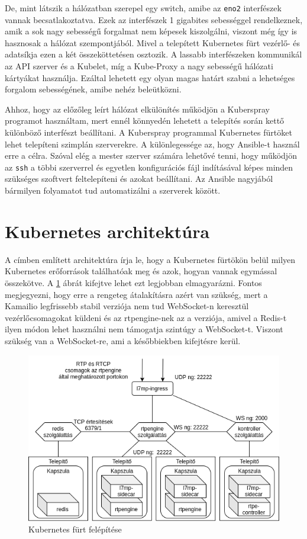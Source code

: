 De, mint látszik a hálózatban szerepel egy switch, amibe az \texttt{eno2} interfészek 
vannak becsatlakoztatva. Ezek az interfészek 1 gigabites sebességgel rendelkeznek, amik
a sok nagy sebességű forgalmat nem képesek kiszolgálni, viszont még így is hasznosak
a hálózat szempontjából. Mivel a telepített Kubernetes fürt vezérlő- és adatsíkja
ezen a két összeköttetésen osztozik. A lassabb interfészeken kommunikál az
API szerver és a Kubelet, míg a Kube-Proxy a nagy sebességű hálózati kártyákat 
használja. Ezáltal lehetett egy olyan magas határt szabni a lehetséges forgalom
sebességének, amibe nehéz beleütközni. 

Ahhoz, hogy az előzőleg leírt hálózat elkülönítés működjön a Kuberspray programot 
használtam, mert ennél könnyedén lehetett a telepítés során kettő különböző interfészt
beállítani. A Kuberspray \cite{kubespray} programmal Kubernetes fürtöket lehet 
telepíteni szimplán szerverekre. A különlegessége az, hogy Ansible-t használ erre a 
célra. Szóval elég a mester szerver számára lehetővé tenni, hogy működjön az \texttt{ssh} 
a többi szerverrel és egyetlen konfigurációs fájl indításával képes minden szükséges 
szoftvert feltelepíteni és azokat beállítani. Az Ansible \cite{ansible} nagyjából 
bármilyen folyamatot tud automatizálni a szerverek között. 

\section{Kubernetes architektúra}

A címben említett architektúra írja le, hogy a Kubernetes fürtökön belül milyen 
Kubernetes erőforrások találhatóak meg és azok, hogyan vannak egymással összekötve. A 
\ref{fig:clusterSetup} ábrát kifejtve lehet ezt legjobban elmagyarázni. Fontos 
megjegyezni, hogy erre a rengeteg átalakításra azért van szükség, mert a Kamailio 
legfrissebb stabil verziója nem tud WebSocket-n keresztül vezérlőcsomagokat küldeni és az 
rtpengine-nek az a verziója, amivel a Redis-t ilyen módon lehet használni nem támogatja 
szintúgy a WebSocket-t. Viszont szükség van a WebSocket-re, ami a későbbiekben kifejtésre 
kerül.

\begin{figure}[!ht]
	\centering
	\includegraphics[width=1\textwidth, keepaspectratio]{figures/cluster.png}
	\caption{Kubernetes fürt felépítése}
	\label{fig:clusterSetup}
\end{figure}

